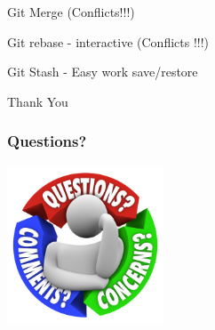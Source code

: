 \documentclass[10pt]{beamer}
\begin{document}
\begin{frame}
  \begin{center}
    \Huge{Git Merge (Conflicts!!!)}
  \end{center}
\end{frame}

\begin{frame}
  \begin{center}
    \Huge{Git rebase - interactive (Conflicts !!!)}
  \end{center}
\end{frame}

\begin{frame}
  \begin{center}
    \Huge{Git Stash - Easy work save/restore }
  \end{center}
\end{frame}

\begin{frame}
  \begin{center}
    \Huge{Thank You}
  \end{center}
\end{frame}

\begin{frame}
	\frametitle{Questions?}
	\begin{center}
	\includegraphics[width=0.35\textwidth]{q5.jpg}
	\end{center}
\end{frame}

\end{document}

